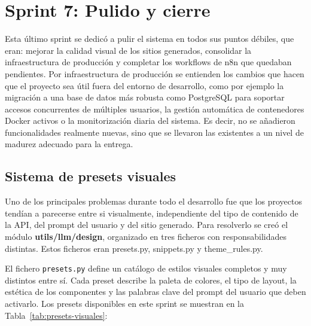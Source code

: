 \section{Sprint 7: Pulido y cierre}
\label{sec:pulido-cierre}

Esta último sprint se dedicó a pulir el sistema en todos sus puntos débiles, que eran: mejorar la calidad visual de los sitios generados, consolidar la infraestructura de producción y completar los workflows de n8n que quedaban pendientes. Por infraestructura de producción se entienden los cambios que hacen que el proyecto sea útil fuera del entorno de desarrollo, como por ejemplo la migración a una base de datos más robusta como PostgreSQL para soportar accesos concurrentes de múltiples usuarios, la gestión automática de contenedores Docker activos o la monitorización diaria del sistema. Es decir, no se añadieron funcionalidades realmente nuevas, sino que se llevaron las existentes a un nivel de madurez adecuado para la entrega.


\subsection{Sistema de presets visuales}
\label{subsec:sistema-presets-visuales}

Uno de los principales problemas durante todo el desarrollo fue que los proyectos tendían a parecerse entre si visualmente, independiente del tipo de contenido de la API, del prompt del usuario y del sitio generado. Para resolverlo se creó el módulo \textbf{utils/llm/design}, organizado en tres ficheros con responsabilidades distintas. Estos ficheros eran presets.py, snippets.py y theme\_rules.py.

El fichero \texttt{presets.py} define un catálogo de estilos visuales completos y muy distintos entre sí. Cada preset describe la paleta de colores, el tipo de layout, la estética de los componentes y las palabras clave del prompt del usuario que deben activarlo. Los presets disponibles en este sprint se muestran en la Tabla~\ref{tab:presets-visuales}:

